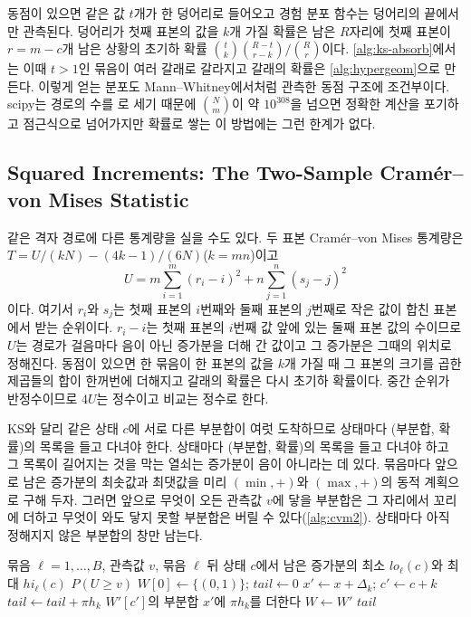 동점이 있으면 같은 값 $t$개가 한 덩어리로 들어오고 경험 분포 함수는 덩어리의 끝에서만 관측된다. 덩어리가 첫째 표본의 값을 $k$개 가질 확률은 남은 $R$자리에 첫째 표본이 $r=m-c$개 남은 상황의 초기하 확률 $\binom tk\binom{R-t}{r-k}/\binom Rr$이다. \cref{alg:ks-absorb}에서는 이때 $t>1$인 묶음이 여러 갈래로 갈라지고 갈래의 확률은 \cref{alg:hypergeom}으로 만든다. 이렇게 얻는 분포도 Mann--Whitney에서처럼 관측한 동점 구조에 조건부이다. scipy는 경로의 수를 로 세기 때문에 $\binom Nm$이 약 $10^{308}$을 넘으면 정확한 계산을 포기하고 점근식으로 넘어가지만 확률로 쌓는 이 방법에는 그런 한계가 없다.

\subsection{Squared Increments: The Two-Sample Cram\'er--von Mises Statistic}

같은 격자 경로에 다른 통계량을 실을 수도 있다. 두 표본 Cram\'er--von Mises 통계량은 $T=U/(kN)-(4k-1)/(6N)$($k=mn$)이고
\[
U=m\sum_{i=1}^m(r_i-i)^2+n\sum_{j=1}^n(s_j-j)^2
\]
이다\cite{anderson1962}. 여기서 $r_i$와 $s_j$는 첫째 표본의 $i$번째와 둘째 표본의 $j$번째로 작은 값이 합친 표본에서 받는 순위이다. $r_i-i$는 첫째 표본의 $i$번째 값 앞에 있는 둘째 표본 값의 수이므로 $U$는 경로가 걸음마다 음이 아닌 증가분을 더해 간 값이고 그 증가분은 그때의 위치로 정해진다. 동점이 있으면 한 묶음이 한 표본의 값을 $k$개 가질 때 그 표본의 크기를 곱한 제곱들의 합이 한꺼번에 더해지고 갈래의 확률은 다시 초기하 확률이다. 중간 순위가 반정수이므로 $4U$는 정수이고 비교는 정수로 한다.

KS와 달리 같은 상태 $c$에 서로 다른 부분합이 여럿 도착하므로 상태마다 (부분합, 확률)의 목록을 들고 다녀야 한다. 상태마다 (부분합, 확률)의 목록을 들고 다녀야 하고 그 목록이 길어지는 것을 막는 열쇠는 증가분이 음이 아니라는 데 있다. 묶음마다 앞으로 남은 증가분의 최솟값과 최댓값을 미리 $(\min,+)$와 $(\max,+)$의 동적 계획으로 구해 두자. 그러면 앞으로 무엇이 오든 관측값 $v$에 닿을 부분합은 그 자리에서 꼬리에 더하고 무엇이 와도 닿지 못할 부분합은 버릴 수 있다(\cref{alg:cvm2}). 상태마다 아직 정해지지 않은 부분합의 창만 남는다.

\begin{algorithm}[htbp]
\begin{algorithmic}[1]
\Require 묶음 $\ell=1,\dots,B$, 관측값 $v$, 묶음 $\ell$ 뒤 상태 $c$에서 남은 증가분의 최소 $\mathit{lo}_\ell(c)$와 최대 $\mathit{hi}_\ell(c)$
\Ensure $P(U\ge v)$
\State $W[0]\gets\{(0,1)\}$; $\mathit{tail}\gets0$
    \State $x'\gets x+\Delta_k$; $c'\gets c+k$
     $\mathit{tail}\gets\mathit{tail}+\pi h_k$ 
     $W'[c']$의 부분합 $x'$에 $\pi h_k$를 더한다 
    \EndIf {}
  \EndFor
  \State $W\gets W'$
\EndFor
\State \Return $\mathit{tail}$
\end{algorithmic}
\caption{두 표본 Cram\'er--von Mises의 정확한 꼬리 (stardust 의 )}
\label{alg:cvm2}
\end{algorithm}

